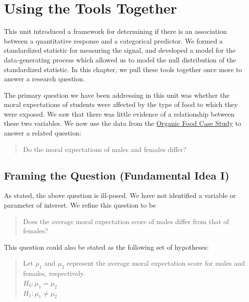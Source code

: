 \documentclass[
]{book}
\theoremstyle{plain}
\theoremstyle{mydefn}
\theoremstyle{myexmpl}
\theoremstyle{remark}
\begin{document}
\hypertarget{ANOVArecap}{%
\chapter{Using the Tools Together}\label{ANOVArecap}}

This unit introduced a framework for determining if there is an association between a quantitative response and a categorical predictor. We formed a standardized statistic for measuring the signal, and developed a model for the data-generating process which allowed us to model the null distribution of the standardized statistic. In this chapter, we pull these tools together once more to answer a research question.

The primary question we have been addressing in this unit was whether the moral expectations of students were affected by the type of food to which they were exposed. We saw that there was little evidence of a relationship between these two variables. We now use the data from the \protect\hyperlink{CaseOrganic}{Organic Food Case Study} to answer a related question:

\begin{quote}
Do the moral expectations of males and females differ?
\end{quote}

\hypertarget{framing-the-question-fundamental-idea-i-1}{%
\section{Framing the Question (Fundamental Idea I)}\label{framing-the-question-fundamental-idea-i-1}}

As stated, the above question is ill-posed. We have not identified a variable or parameter of interest. We refine this question to be

\begin{quote}
Does the average moral expectation score of males differ from that of females?
\end{quote}

This question could also be stated as the following set of hypotheses:

\begin{quote}
Let \(\mu_1\) and \(\mu_2\) represent the average moral expectation score for males and females, respectively.\\
\(H_0: \mu_1 = \mu_2\)\\
\(H_1: \mu_1 \neq \mu_2\)
\end{quote}
\end{document}
